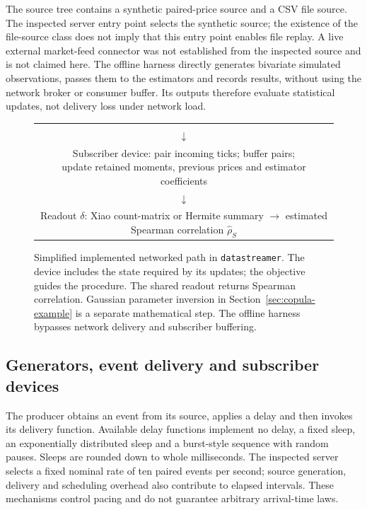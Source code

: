 The source tree contains a synthetic paired-price source and a CSV file source. The inspected server entry point selects the synthetic source; the existence of the file-source class does not imply that this entry point enables file replay. A live external market-feed connector was not established from the inspected source and is not claimed here. The offline harness directly generates bivariate simulated observations, passes them to the estimators and records results, without using the network broker or consumer buffer. Its outputs therefore evaluate statistical updates, not delivery loss under network load.

\begin{figure}[htbp]
\centering
\small
{}
\par\medskip
\begin{tabular}{c}
\fbox{\parbox{0.84\linewidth}{\centering Synthetic generator $\longrightarrow$ event delivery}}\\[3pt]
$\downarrow$\\[3pt]
\fbox{\parbox{0.84\linewidth}{\centering Subscriber device: pair incoming ticks; buffer pairs;\\
update retained moments, previous prices and estimator coefficients}}\\[3pt]
$\downarrow$\\[3pt]
\fbox{\parbox{0.84\linewidth}{\centering Readout $\delta$: Xiao count-matrix or Hermite summary\\
$\longrightarrow$ estimated Spearman correlation $\widehat\rho_S$}}
\end{tabular}
\caption{Simplified implemented networked path in \texttt{datastreamer}. The device includes the state required by its updates; the objective guides the procedure. The shared readout returns Spearman correlation. Gaussian parameter inversion in Section~\ref{sec:copula-example} is a separate mathematical step. The offline harness bypasses network delivery and subscriber buffering.}
\label{fig:datastreamer}
\end{figure}

\subsection{Generators, event delivery and subscriber devices}
The producer obtains an event from its source, applies a delay and then invokes its delivery function. Available delay functions implement no delay, a fixed sleep, an exponentially distributed sleep and a burst-style sequence with random pauses. Sleeps are rounded down to whole milliseconds. The inspected server selects a fixed nominal rate of ten paired events per second; source generation, delivery and scheduling overhead also contribute to elapsed intervals. These mechanisms control pacing and do not guarantee arbitrary arrival-time laws.

